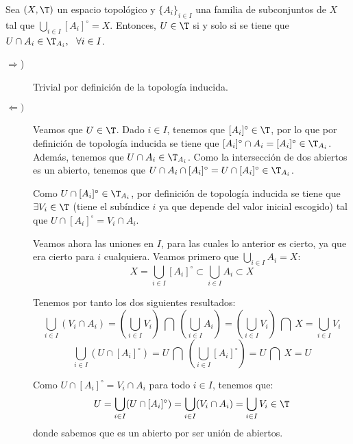 \begin{ejercicio}
    Sea $(X,\T)$ un espacio topológico y $\{A_i\}_{i\in I}$ una familia de subconjuntos de $X$ tal que $\bigcup\limits_{i\in I}[A_i]^\circ=X$. Entonces, $U\in \T$ si y solo si se tiene que $U\cap A_i\in \T_{A_i},~~\forall i\in I$.
    \begin{description}
        \item[$\Longrightarrow$)] Trivial por definición de la topología inducida.

        \item[$\Longleftarrow)$] Veamos que $U\in \T$. Dado $i\in I$, tenemos que $[A_i]^\circ\in \T$, por lo que por definición de topología inducida se tiene que $[A_i]^\circ \cap A_i = [A_i]^\circ \in \T_{A_i}$. Además, tenemos que $U\cap A_i\in \T_{A_i}$. Como la intersección de dos abiertos es un abierto, tenemos que $U\cap A_i\cap [A_i]^\circ =U\cap [A_i]^\circ \in \T_{A_i}$.

        Como $U\cap [A_i]^\circ \in \T_{A_i}$, por definición de topología inducida se tiene que $\exists V_i\in \T$ (tiene el subíndice $i$ ya que depende del valor inicial escogido) tal que $U\cap [A_i]^\circ=V_i\cap A_i$.

        Veamos ahora las uniones en $I$, para las cuales lo anterior es cierto, ya que era cierto para $i$ cualquiera. Veamos primero que $\bigcup\limits_{i\in I} A_i=X$:
        \begin{equation*}
            X=\bigcup_{i\in I} [A_i]^\circ \subset \bigcup_{i\in I} A_i\subset X
        \end{equation*}
        
        Tenemos por tanto los dos siguientes resultados:
        \begin{equation*}
            \bigcup_{i\in I} (V_i\cap A_i) = \left(\bigcup_{i\in I} V_i\right) ~\bigcap~\left(\bigcup_{i\in I} A_i\right)
            = \left(\bigcup_{i\in I} V_i\right) ~\bigcap~ X = \bigcup_{i\in I} V_i
        \end{equation*}
        \begin{equation*}
            \bigcup_{i\in I} (U\cap [A_i]^\circ) = U ~\bigcap~\left(\bigcup_{i\in I} [A_i]^\circ\right)
            = U ~\bigcap~ X = U
        \end{equation*}

        Como $U\cap [A_i]^\circ=V_i\cap A_i$ para todo $i\in I$, tenemos que:
        \begin{equation*}
            U=\bigcup_{i\in I} (U\cap [A_i]^\circ) = \bigcup_{i\in I} (V_i\cap A_i)= \bigcup_{i\in I} V_i \in \T
        \end{equation*}
        donde sabemos que es un abierto por ser unión de abiertos.
    \end{description}
\end{ejercicio}

